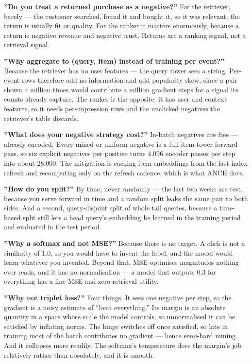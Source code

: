 \documentclass[10pt,twoside]{book}
\begin{document}
\textbf{''Do you treat a returned purchase as a negative?''} For the retriever, barely --- the customer searched, found it and bought it, so it was relevant; the return is usually fit or quality. For the ranker it matters enormously, because a return is negative revenue and negative trust. Returns are a ranking signal, not a retrieval signal.\par
\textbf{''Why aggregate to (query, item) instead of training per event?''} Because the retriever has no user features --- the query tower sees a string. Per-event rows therefore add no information and add popularity skew, since a pair shown a million times would contribute a million gradient steps for a signal its counts already capture. The ranker is the opposite: it has user and context features, so it needs per-impression rows and the unclicked negatives the retriever's table discards.\par
\textbf{''What does your negative strategy cost?''} In-batch negatives are free --- already encoded. Every mined or uniform negative is a full item-tower forward pass, so six explicit negatives per positive turns 4,096 encoder passes per step into about 28,000. The mitigation is caching item embeddings from the last index refresh and recomputing only on the refresh cadence, which is what ANCE does.\par
\textbf{''How do you split?''} By time, never randomly --- the last two weeks are test, because you serve forward in time and a random split leaks the same pair to both sides. And a second, query-disjoint split of whole tail queries, because a time-based split still lets a head query's embedding be learned in the training period and evaluated in the test period.\par
\textbf{''Why a softmax and not MSE?''} Because there is no target. A click is not a similarity of 1.0, so you would have to invent the label, and the model would learn whatever you invented. Beyond that, MSE optimises magnitudes nothing ever reads, and it has no normalisation --- a model that outputs 0.3 for everything has a fine MSE and zero retrieval utility.\par
\textbf{''Why not triplet loss?''} Four things. It sees one negative per step, so the gradient is a noisy estimate of ``beat everything.'' Its margin is an absolute quantity in a space whose scale the model controls, so unnormalised it can be satisfied by inflating norms. The hinge switches off once satisfied, so late in training most of the batch contributes no gradient --- hence semi-hard mining. And it collapses more readily. The softmax's temperature does the margin's job relatively rather than absolutely, and it is smooth.\par
\end{document}
